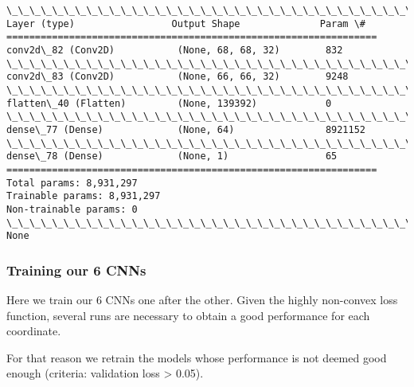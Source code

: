 \documentclass[11pt]{article}
\begin{document}
    \begin{Verbatim}[commandchars=\\\{\}]
\_\_\_\_\_\_\_\_\_\_\_\_\_\_\_\_\_\_\_\_\_\_\_\_\_\_\_\_\_\_\_\_\_\_\_\_\_\_\_\_\_\_\_\_\_\_\_\_\_\_\_\_\_\_\_\_\_\_\_\_\_\_\_\_\_
Layer (type)                 Output Shape              Param \#   
=================================================================
conv2d\_82 (Conv2D)           (None, 68, 68, 32)        832       
\_\_\_\_\_\_\_\_\_\_\_\_\_\_\_\_\_\_\_\_\_\_\_\_\_\_\_\_\_\_\_\_\_\_\_\_\_\_\_\_\_\_\_\_\_\_\_\_\_\_\_\_\_\_\_\_\_\_\_\_\_\_\_\_\_
conv2d\_83 (Conv2D)           (None, 66, 66, 32)        9248      
\_\_\_\_\_\_\_\_\_\_\_\_\_\_\_\_\_\_\_\_\_\_\_\_\_\_\_\_\_\_\_\_\_\_\_\_\_\_\_\_\_\_\_\_\_\_\_\_\_\_\_\_\_\_\_\_\_\_\_\_\_\_\_\_\_
flatten\_40 (Flatten)         (None, 139392)            0         
\_\_\_\_\_\_\_\_\_\_\_\_\_\_\_\_\_\_\_\_\_\_\_\_\_\_\_\_\_\_\_\_\_\_\_\_\_\_\_\_\_\_\_\_\_\_\_\_\_\_\_\_\_\_\_\_\_\_\_\_\_\_\_\_\_
dense\_77 (Dense)             (None, 64)                8921152   
\_\_\_\_\_\_\_\_\_\_\_\_\_\_\_\_\_\_\_\_\_\_\_\_\_\_\_\_\_\_\_\_\_\_\_\_\_\_\_\_\_\_\_\_\_\_\_\_\_\_\_\_\_\_\_\_\_\_\_\_\_\_\_\_\_
dense\_78 (Dense)             (None, 1)                 65        
=================================================================
Total params: 8,931,297
Trainable params: 8,931,297
Non-trainable params: 0
\_\_\_\_\_\_\_\_\_\_\_\_\_\_\_\_\_\_\_\_\_\_\_\_\_\_\_\_\_\_\_\_\_\_\_\_\_\_\_\_\_\_\_\_\_\_\_\_\_\_\_\_\_\_\_\_\_\_\_\_\_\_\_\_\_
None

    \end{Verbatim}

    \hypertarget{training-our-6-cnns}{%
\subsubsection{Training our 6 CNNs}\label{training-our-6-cnns}}

Here we train our 6 CNNs one after the other. Given the highly
non-convex loss function, several runs are necessary to obtain a good
performance for each coordinate.

For that reason we retrain the models whose performance is not deemed
good enough (criteria: validation loss \textgreater{} 0.05).
\end{document}
